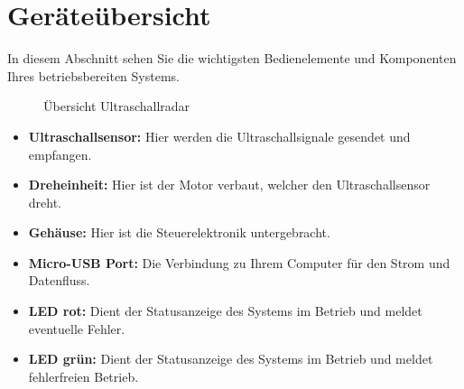 %
%

\chapter{Geräteübersicht}
In diesem Abschnitt sehen Sie die wichtigsten Bedienelemente und Komponenten Ihres betriebsbereiten Systems.

\begin{figure}[h]
	\centering
	
	\caption{Übersicht Ultraschallradar}
\end{figure}

\begin{itemize}
	\item \textbf{Ultraschallsensor:} Hier werden die Ultraschallsignale gesendet und empfangen.
	\item \textbf{Dreheinheit:} Hier ist der Motor verbaut, welcher den Ultraschallsensor dreht.
	\item \textbf{Gehäuse:} Hier ist die Steuerelektronik untergebracht.
	\item \textbf{Micro-USB Port:} Die Verbindung zu Ihrem Computer für den Strom und Datenfluss.
	\item \textbf{LED rot:} Dient der Statusanzeige des Systems im Betrieb und meldet eventuelle Fehler.
	\item \textbf{LED grün:} Dient der Statusanzeige des Systems im Betrieb und meldet fehlerfreien Betrieb.
\end{itemize}
